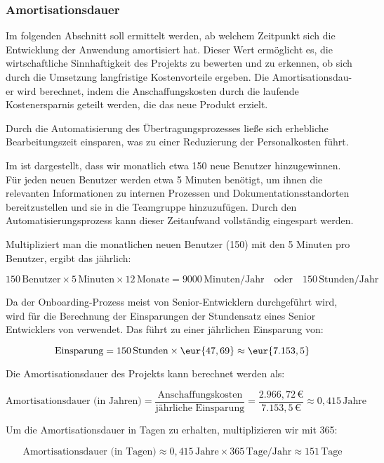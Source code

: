 \subsubsection{Amortisationsdauer}
\label{sec:Amortisationsdauer}

Im folgenden Abschnitt soll ermittelt werden, ab welchem Zeitpunkt sich die Entwicklung der Anwendung amortisiert hat. Dieser Wert ermöglicht es, die wirtschaftliche Sinnhaftigkeit des Projekts zu bewerten und zu erkennen, ob sich durch die Umsetzung langfristige Kostenvorteile ergeben. Die Amortisationsdau-
er wird berechnet, indem die Anschaffungskosten durch die laufende Kostenersparnis geteilt werden, die das neue Produkt erzielt. 

Durch die Automatisierung des Übertragungsprozesses ließe sich erhebliche Bearbeitungszeit einsparen, was zu einer Reduzierung der Personalkosten führt.

Im  ist dargestellt, dass wir monatlich etwa 150 neue Benutzer hinzugewinnen. Für jeden neuen Benutzer werden etwa 5 Minuten benötigt, um ihnen die relevanten Informationen zu internen Prozessen und Dokumentationsstandorten bereitzustellen und sie in die Teamgruppe hinzuzufügen. Durch den Automatisierungsprozess kann dieser Zeitaufwand vollständig eingespart werden.

Multipliziert man die monatlichen neuen Benutzer (150) mit den 5 Minuten pro Benutzer, ergibt das jährlich:

\[
150 \, \text{Benutzer} \times 5 \, \text{Minuten} \times 12 \, \text{Monate} = 9000 \, \text{Minuten/Jahr} \quad \text{oder} \quad 150 \, \text{Stunden/Jahr}
\]

Da der Onboarding-Prozess meist von Senior-Entwicklern durchgeführt wird, wird für die Berechnung der Einsparungen der Stundensatz eines Senior Entwicklers von  verwendet. Das führt zu einer jährlichen Einsparung von:

\[
\text{Einsparung} = 150 \, \text{Stunden} \times \eur{47,69} \approx \eur{7.153,5}
\]

Die Amortisationsdauer des Projekts kann berechnet werden als:

\[
\text{Amortisationsdauer (in Jahren)} = \frac{\text{Anschaffungskosten}}{\text{jährliche Einsparung}} = \frac{2.966,72 \, \text{€}}{7.153,5 \, \text{€}} \approx 0,415 \, \text{Jahre}
\]

Um die Amortisationsdauer in Tagen zu erhalten, multiplizieren wir mit 365:

\[
\text{Amortisationsdauer (in Tagen)} \approx 0,415 \, \text{Jahre} \times 365 \, \text{Tage/Jahr} \approx 151 \, \text{Tage}
\]

